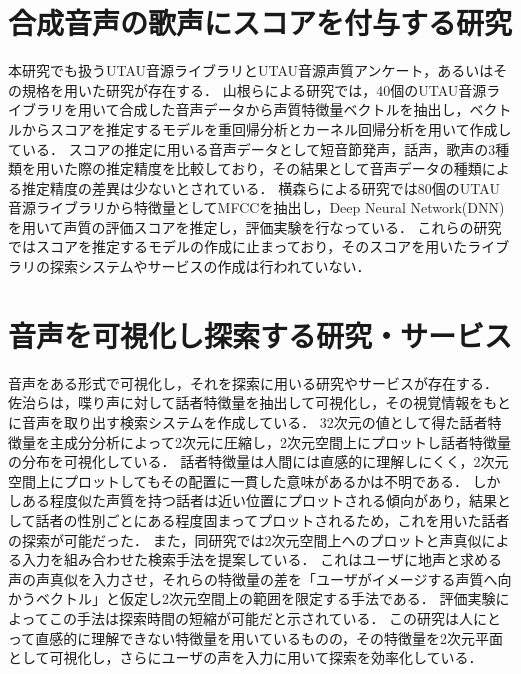 \section{合成音声の歌声にスコアを付与する研究}
本研究でも扱うUTAU音源ライブラリとUTAU音源声質アンケート，あるいはその規格を用いた研究が存在する．
山根らによる研究\cite{ong}では，40個のUTAU音源ライブラリを用いて合成した音声データから声質特徴量ベクトルを抽出し，ベクトルからスコアを推定するモデルを重回帰分析とカーネル回帰分析を用いて作成している．
スコアの推定に用いる音声データとして短音節発声，話声，歌声の3種類を用いた際の推定精度を比較しており，その結果として音声データの種類による推定精度の差異は少ないとされている．
横森らによる研究\cite{dnn}では80個のUTAU音源ライブラリから特徴量としてMFCCを抽出し，Deep Neural Network(DNN)を用いて声質の評価スコアを推定し，評価実験を行なっている．
これらの研究ではスコアを推定するモデルの作成に止まっており，そのスコアを用いたライブラリの探索システムやサービスの作成は行われていない．

\section{音声を可視化し探索する研究・サービス}
音声をある形式で可視化し，それを探索に用いる研究やサービスが存在する．
佐治らは，喋り声に対して話者特徴量を抽出して可視化し，その視覚情報をもとに音声を取り出す検索システムを作成している\cite{talk_search}．
32次元の値として得た話者特徴量を主成分分析によって2次元に圧縮し，2次元空間上にプロットし話者特徴量の分布を可視化している．
話者特徴量は人間には直感的に理解しにくく，2次元空間上にプロットしてもその配置に一貫した意味があるかは不明である．
しかしある程度似た声質を持つ話者は近い位置にプロットされる傾向があり，結果として話者の性別ごとにある程度固まってプロットされるため，これを用いた話者の探索が可能だった．
また，同研究では2次元空間上へのプロットと声真似による入力を組み合わせた検索手法を提案している．
これはユーザに地声と求める声の声真似を入力させ，それらの特徴量の差を「ユーザがイメージする声質へ向かうベクトル」と仮定し2次元空間上の範囲を限定する手法である．
評価実験によってこの手法は探索時間の短縮が可能だと示されている．
この研究は人にとって直感的に理解できない特徴量を用いているものの，その特徴量を2次元平面として可視化し，さらにユーザの声を入力に用いて探索を効率化している．

